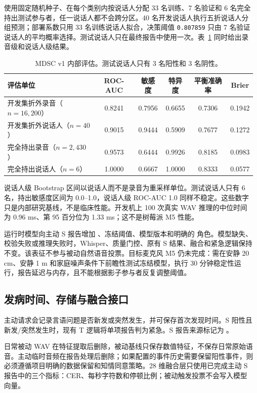 \documentclass[11pt,a4paper]{article}
\begin{document}
使用固定随机种子、在每个类别内按说话人分配 33 名训练、7 名验证和 6 名完全持出测试参与者，任一说话人都不会跨分区。40 名开发说话人执行五折说话人分组预测；部署系数只用 33 名训练说话人拟合，决策阈值 \texttt{0.807859} 只由 7 名验证说话人的平均概率选择。测试说话人只在最终报告中使用一次。表~\ref{tab:mdsc-results-zh} 同时给出录音级和说话人级结果。

\begin{table}[htbp]
\centering
\small
\caption{MDSC v1 内部评估。测试说话人只有 3 名阳性和 3 名阴性。}
\label{tab:mdsc-results-zh}
\begin{tabular}{lccccc}
\toprule
评估单位 & ROC-AUC & 敏感度 & 特异度 & 平衡准确率 & Brier \\
\midrule
开发集折外录音（$n=16{,}200$） & 0.8241 & 0.7956 & 0.6655 & 0.7306 & 0.1942 \\
开发集折外说话人（$n=40$） & 0.9015 & 0.9444 & 0.5909 & 0.7677 & 0.1272 \\
完全持出录音（$n=2{,}430$） & 0.9573 & 0.6444 & 0.9926 & 0.8185 & 0.0983 \\
完全持出说话人（$n=6$） & 1.0000 & 0.6667 & 1.0000 & 0.8333 & 0.0577 \\
\bottomrule
\end{tabular}
\end{table}

说话人级 Bootstrap 区间以说话人而不是录音为重采样单位。测试说话人只有 6 名，持出敏感度区间为 0.0--1.0，说话人级 ROC-AUC 1.0 同样不稳定。这些数字只是内部研究基线，不是临床性能。开发机上 100 次真实 WAV 推理的中位时间为 0.96 ms、第 95 百分位为 1.33 ms；这不是树莓派 M5 性能。

运行时模型向主动 S 报告增加 、冻结阈值、模型版本和明确的  角色。模型缺失、校验失败或推理失败时，Whisper、质量门控、原有 S 结果、融合和紧急逻辑保持不变。该表征不参与被动自然语音投票。目标麦克风 M5 仍未完成：需在安静 20 cm、安静 1 m 和家庭噪声条件下前瞻性测试冻结模型，执行 30 分钟稳定性运行，报告延迟与内存，且不能根据影子参与者反复调整阈值。

\subsection{发病时间、存储与融合接口}

主动请求会记录言语问题是否新发或突然发生，并可保存首次发现时间。S 阳性且新发/突然发生时，现有 T 逻辑将单项报告判为紧急。S 报告来源标记为 。

日常被动 WAV 在特征提取后删除，被动基线只保存数值特征，不保存日常原始语音。主动临时音频在报告处理后删除；如果配置的事件历史需要保留阳性事件，则必须遵循项目明确的数据保留和知情同意策略。28 维融合层只使用已完成主动 S 报告中的三个指标：CER、每秒字符数和停顿比例；被动触发投票不会写入模型向量。
\end{document}
